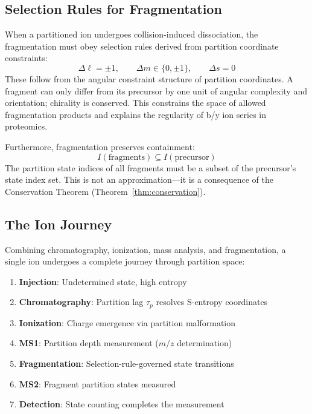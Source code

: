 \documentclass[twocolumn,10pt,a4paper]{article}
\theoremstyle{definition}
\theoremstyle{remark}
\newcommand{\taup}{\tau_p}
\begin{document}
\subsection{Selection Rules for Fragmentation}

When a partitioned ion undergoes collision-induced dissociation, the fragmentation must obey selection rules derived from partition coordinate constraints:
\begin{equation}
    \Delta\ell = \pm 1, \qquad \Delta m \in \{0, \pm 1\}, \qquad \Delta s = 0
    \label{eq:selection}
\end{equation}
These follow from the angular constraint structure of partition coordinates. A fragment can only differ from its precursor by one unit of angular complexity and orientation; chirality is conserved. This constrains the space of allowed fragmentation products and explains the regularity of b/y ion series in proteomics.

Furthermore, fragmentation preserves containment:
\begin{equation}
    I(\text{fragments}) \subseteq I(\text{precursor})
\end{equation}
The partition state indices of all fragments must be a subset of the precursor's state index set. This is not an approximation---it is a consequence of the Conservation Theorem (Theorem~\ref{thm:conservation}).

\subsection{The Ion Journey}

Combining chromatography, ionization, mass analysis, and fragmentation, a single ion undergoes a complete journey through partition space:
\begin{enumerate}[label=\arabic*., nosep]
    \item \textbf{Injection}: Undetermined state, high entropy
    \item \textbf{Chromatography}: Partition lag $\taup$ resolves S-entropy coordinates
    \item \textbf{Ionization}: Charge emergence via partition malformation
    \item \textbf{MS1}: Partition depth measurement ($m/z$ determination)
    \item \textbf{Fragmentation}: Selection-rule-governed state transitions
    \item \textbf{MS2}: Fragment partition states measured
    \item \textbf{Detection}: State counting completes the measurement
\end{enumerate}
\end{document}
